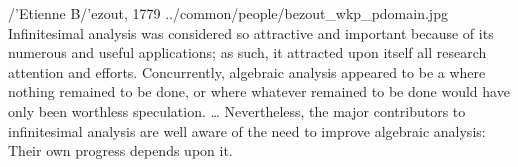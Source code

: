 \qboxnpq
  {{/'E}tienne B{/'e}zout, 1779 \footnotemark}
  {../common/people/bezout_wkp_pdomain.jpg}
  {Infinitesimal analysis was considered so attractive and important because of its numerous and useful applications;
  as such, it attracted upon itself all research attention and efforts.
  Concurrently, algebraic analysis appeared to be a  where nothing remained to be done,
  or where whatever remained to be done would have only been worthless speculation.
  \ldots
  Nevertheless, the major contributors to infinitesimal analysis are well aware of the need to improve algebraic analysis: 
  Their own progress depends upon it.}


